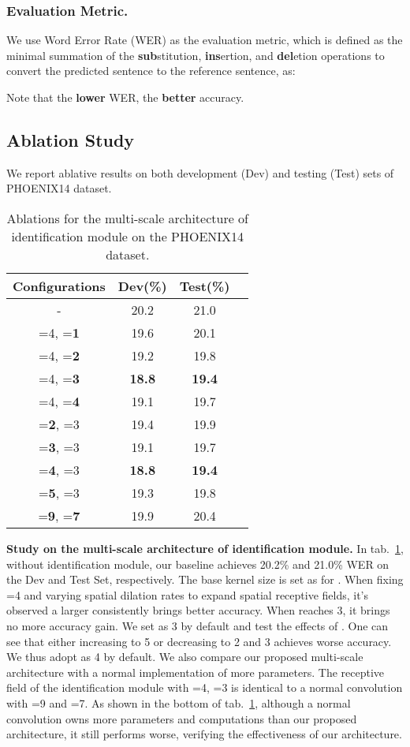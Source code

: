 \documentclass[10pt,twocolumn,letterpaper]{article}
\begin{document}
\subsubsection{Evaluation Metric.} We use Word Error Rate (WER) as the evaluation metric, which is defined as the minimal summation of the \textbf{sub}stitution, \textbf{ins}ertion, and \textbf{del}etion operations to convert the predicted sentence to the reference sentence, as:

Note that the \textbf{lower} WER, the \textbf{better} accuracy.

\subsection{Ablation Study}
We report ablative results on both development (Dev) and testing (Test) sets of PHOENIX14 dataset.

\begin{table}[t]   
  \centering
  \begin{tabular}{cccc}
  \hline
  Configurations & Dev(\%) & Test(\%)\\
  \hline
  - & 20.2 & 21.0\\
  \hline
  =4, =\textbf{1}  & 19.6  & 20.1\\
  =4, =\textbf{2} & 19.2 & 19.8 \\
  =4, =\textbf{3} & \textbf{18.8} & \textbf{19.4} \\
  =4, =\textbf{4}  & 19.1  &19.7 \\
  \hline
  =\textbf{2}, =3 & 19.4  & 19.9 \\
  =\textbf{3}, =3 & 19.1  & 19.7 \\
  =\textbf{4}, =3 & \textbf{18.8} & \textbf{19.4} \\
  =\textbf{5}, =3  & 19.3 & 19.8 \\
  \hline
  =\textbf{9}, =\textbf{7} & 19.9 & 20.4 \\
  \hline
  \end{tabular}
  \caption{Ablations for the multi-scale architecture of identification module on the PHOENIX14 dataset.} 
  \label{tab1} 
  \end{table}

\textbf{Study on the multi-scale architecture of identification module.} In tab.~\ref{tab1}, without identification module, our baseline achieves 20.2\% and 21.0\% WER on the Dev and Test Set, respectively. The base kernel size is set as  for . When fixing =4 and varying spatial dilation rates to expand spatial receptive fields, it's observed a larger  consistently brings better accuracy. When  reaches 3, it brings no more accuracy gain. We set  as 3 by default and test the effects of . One can see that either increasing  to 5 or decreasing  to 2 and 3 achieves worse accuracy. We thus adopt  as 4 by default. We also compare our proposed multi-scale architecture with a normal implementation of more parameters. The receptive field of the identification module with =4, =3 is identical to a normal convolution with =9 and =7. As shown in the bottom of tab.~\ref{tab1}, although a normal convolution owns more parameters and computations than our proposed architecture, it still performs worse, verifying the effectiveness of our architecture.
\end{document}
